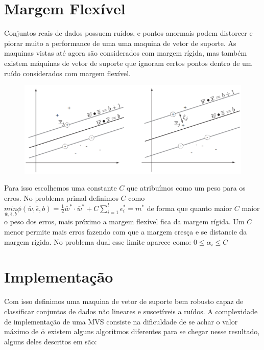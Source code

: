 \section{Margem Flexível}
Conjuntos reais de dados possuem ruídos, e pontos anormais podem distorcer e piorar muito a performance de uma uma maquina de vetor de suporte. As maquinas vistas até agora são considerados com margem rígida, mas também existem máquinas de vetor de suporte que ignoram certos pontos dentro de um ruído considerados com margem flexível.

\begin{figure}
  \centering
  \includegraphics[width=1\textwidth]{imagens/svm_6.png}
  \label{fig:LABEL_FIG_6}
\end{figure}

Para isso escolhemos uma constante $C$ que atribuímos como um peso para os erros. No problema primal definimos $C$ como $\underset{\bar{w},\bar{\epsilon},b}{min}\phi(\bar{w},\bar{\epsilon},b) = \frac{1}{2}\bar{w}^*\cdot\bar{w}^* + C\sum_{i=1}^l \epsilon_i^*=m^*$ de forma que quanto maior $C$ maior o peso dos erros, mais próximo a margem flexível fica da margem rígida. Um $C$ menor permite mais erros fazendo com que a margem cresça e se distancie da margem rígida. No problema dual esse limite aparece como: $0\le \alpha_i \le C$

\section{Implementação}
Com isso definimos uma maquina de vetor de suporte bem robusto capaz de classificar conjuntos de dados não lineares e suscetíveis a ruídos. A complexidade de implementação de uma MVS consiste na dificuldade de se achar o valor máximo de $\bar{\alpha}$ existem alguns algoritmos diferentes para se chegar nesse resultado, alguns deles descritos em \cite{art:LIVRO_SVM} são:


